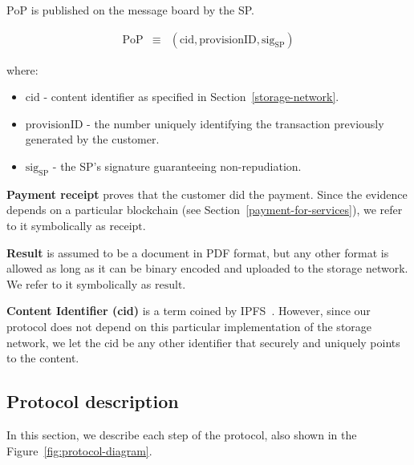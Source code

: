 \documentclass[pdftex,twocolumn,epjc3]{svjour3}
\begin{document}
{$\mathrm{PoP}$ is published on the message board by the SP.


\begin{eqnarray}
\mathrm{PoP} & \equiv & (\mathrm{cid}, \mathrm{provisionID}, \mathrm{sig}_\mathrm{SP})
\end{eqnarray}

where:

\begin{itemize}

\item $\mathrm{cid}$ - content identifier as specified in Section~\ref{storage-network}.
\item $\mathrm{provisionID}$ - the number uniquely identifying the transaction previously generated by the customer.
\item $\mathrm{sig}_\mathrm{SP}$ - the SP's signature guaranteeing non-repudiation.
\end{itemize}

\noindent \textbf
{Payment receipt}\label{payment-receipt} proves that the customer did the payment. Since the evidence depends on a particular blockchain (see Section~\ref{payment-for-services}), we refer to it symbolically as
$\mathrm{receipt}$.

\noindent \textbf
{Result}\label{results} is assumed to be a document in PDF format, but any other format is allowed as long as it can be binary encoded and uploaded to the storage network. We refer to it symbolically as $\mathrm{result}$.

\noindent \textbf
{Content Identifier (cid)}\label{content-identifier-cid} is a term coined by IPFS~\cite{ipfsContentIdentifiersCIDs}. However, since our protocol does not depend on this particular implementation of the storage network, we let the $\mathrm{cid}$ be any other identifier that securely and uniquely points to the content.

\subsection{Protocol description}\label{protocol-description}

In this section, we describe each step of the protocol, also shown in the Figure~\ref{fig:protocol-diagram}.

}
\end{document}
